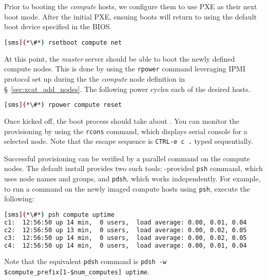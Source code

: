Prior to booting the {\em compute} hosts, we configure them to use PXE as their
next boot mode. After the initial PXE, ensuing boots will return to using the default boot device
specified in the BIOS.

\begin{lstlisting}[language=bash,keywords={},upquote=true]
[sms](*\#*) rsetboot compute net
\end{lstlisting} 

At this point, the {\em master} server should be able to boot the newly defined
compute nodes. This is done by using the \texttt{rpower} \xCAT{} command
leveraging IPMI protocol set up during the the {\em compute} node definition
in \S~\ref{sec:xcat_add_nodes}. The following power cycles each of the
desired hosts.


\begin{lstlisting}[language=bash,keywords={},upquote=true]
[sms](*\#*) rpower compute reset
\end{lstlisting} 

Once kicked off, the boot process should take about .  You can monitor the
provisioning by using the \texttt{rcons} command, which displays serial console
for a selected node. Note that the escape sequence
is \texttt{CTRL-e c .} typed sequentially. 

Successful provisioning can be verified by a parallel command on the compute
nodes. The default install provides two such tools: \xCAT{}-provided
\texttt{psh} command, which uses \xCAT{} node names and groups,
and \texttt{pdsh}, which works independently.  For example, to run a command on
the newly imaged compute hosts using \texttt{psh}, execute the following:

\begin{lstlisting}[language=bash]
[sms](*\#*) psh compute uptime
c1:  12:56:50 up 14 min,  0 users,  load average: 0.00, 0.01, 0.04
c2:  12:56:50 up 13 min,  0 users,  load average: 0.00, 0.02, 0.05
c3:  12:56:50 up 14 min,  0 users,  load average: 0.00, 0.02, 0.05
c4:  12:56:50 up 14 min,  0 users,  load average: 0.00, 0.01, 0.04
\end{lstlisting}
Note that the equivalent \texttt{pdsh} command is \texttt{pdsh -w \${compute_prefix}[1-\${num_computes}] uptime}.
